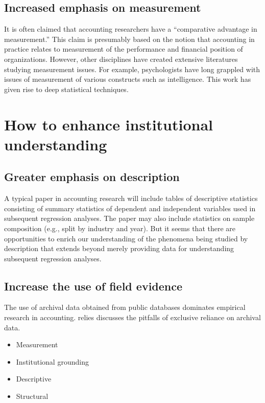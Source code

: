 \documentclass[11pt]{amsart}
\begin{document}
\subsection{Increased emphasis on measurement}
It is often claimed that accounting researchers have a ``comparative advantage in measurement.'' This claim is presumably based on the notion that accounting in practice relates to measurement of the performance and financial position of organizations. However, other disciplines have created extensive literatures studying measurement issues. For example, psychologists have long grappled with issues of measurement of various constructs such as intelligence. This work has given rise to deep statistical techniques.

\section{How to enhance institutional understanding}

\subsection{Greater emphasis on description}
A typical paper in accounting research will include tables of descriptive statistics consisting of summary statistics of dependent and independent variables used in subsequent regression analyses. The paper may also include statistics on sample composition (e.g., split by industry and year). But it seems that there are opportunities to enrich our understanding of the phenomena being studied by description that extends beyond merely providing data for understanding subsequent regression analyses.

\subsection{Increase the use of field evidence}

The use of archival data obtained from public databases dominates empirical research in accounting. relies \cite{Soltes:2014gr} discusses the pitfalls of exclusive reliance on archival data. 


\begin{itemize}
\item Measurement
\item Institutional grounding
\item Descriptive
\item Structural
\end{itemize}
\end{document}

